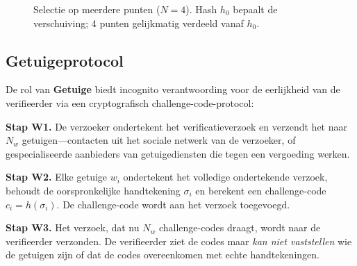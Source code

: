 \documentclass[11pt,a4paper,twocolumn]{article}
\begin{document}
\begin{figure}[ht]
\centering
{}
\caption{Selectie op meerdere punten ($N{=}4$). Hash $h_0$ bepaalt de verschuiving; 4 punten gelijkmatig verdeeld vanaf $h_0$.}
\label{fig:multipoint}
\end{figure}

\subsection{Getuigeprotocol}

De rol van \textbf{Getuige} biedt incognito verantwoording voor de eerlijkheid van de verifieerder via een cryptografisch challenge-code-protocol:

\textbf{Stap W1.} De verzoeker ondertekent het verificatieverzoek en verzendt het naar $N_w$ getuigen---contacten uit het sociale netwerk van de verzoeker, of gespecialiseerde aanbieders van getuigediensten die tegen een vergoeding werken.

\textbf{Stap W2.} Elke getuige $w_i$ ondertekent het volledige ondertekende verzoek, behoudt de oorspronkelijke handtekening $\sigma_i$ en berekent een challenge-code $c_i = h(\sigma_i)$. De challenge-code wordt aan het verzoek toegevoegd.

\textbf{Stap W3.} Het verzoek, dat nu $N_w$ challenge-codes draagt, wordt naar de verifieerder verzonden. De verifieerder ziet de codes maar \emph{kan niet vaststellen} wie de getuigen zijn of dat de codes overeenkomen met echte handtekeningen.
\end{document}
